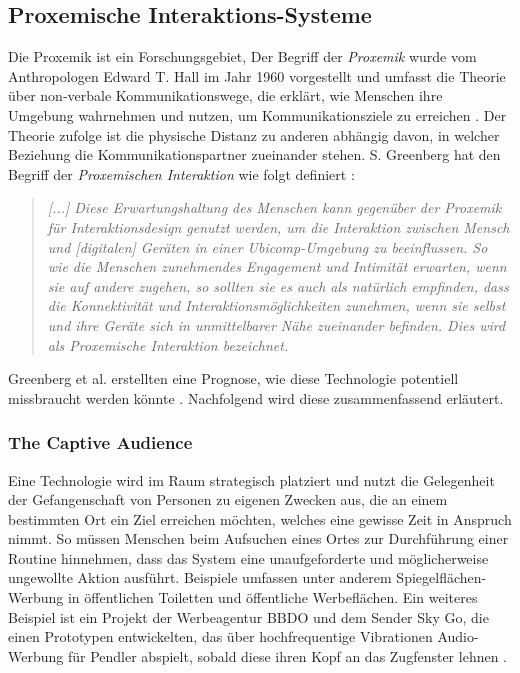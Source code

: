 \documentclass[a4paper]{article}
\newcommand{\todo}[1]{{\color{purple}{#1}}}
\begin{document}
\subsection{Proxemische Interaktions-Systeme}
\label{sub:proxemische_interaktions-systeme}{}
Die Proxemik ist ein Forschungsgebiet, 
Der Begriff der \textit{Proxemik} wurde vom Anthropologen Edward T. Hall im Jahr 1960 vorgestellt und umfasst die Theorie über non-verbale Kommunikationswege, die erklärt, wie Menschen ihre Umgebung wahrnehmen und nutzen, um Kommunikationsziele zu erreichen \cite{communicationstudies}. Der Theorie zufolge ist die physische Distanz zu anderen abhängig davon, in welcher Beziehung die Kommunikationspartner zueinander stehen. S. Greenberg hat den Begriff der \textit{Proxemischen Interaktion} wie folgt definiert \cite{marquardt}:\newline 
\begin{quote}
\textit{[...] Diese Erwartungshaltung des Menschen kann gegenüber der Proxemik für Interaktionsdesign genutzt werden, um die Interaktion zwischen Mensch und [digitalen] Geräten in einer Ubicomp-Umgebung \todo{Schönere Bezeichnung finden oder Definition formulieren} zu beeinflussen. So wie die Menschen zunehmendes Engagement und Intimität erwarten, wenn sie auf andere zugehen, so sollten sie es auch als natürlich empfinden, dass die Konnektivität und Interaktionsmöglichkeiten zunehmen, wenn sie selbst und ihre Geräte sich in unmittelbarer Nähe zueinander befinden. Dies wird als Proxemische Interaktion bezeichnet.}
\end{quote}
Greenberg et al. erstellten eine Prognose, wie diese Technologie potentiell missbraucht werden könnte \cite{greenberg}. Nachfolgend wird diese zusammenfassend erläutert.

\subsubsection{The Captive Audience}
\label{sssec:the_captive_audience}
Eine Technologie wird im Raum strategisch platziert und nutzt die Gelegenheit der \glqq Gefangenschaft\grqq{} von Personen zu eigenen Zwecken aus, die an einem bestimmten Ort ein Ziel erreichen möchten, welches eine gewisse Zeit in Anspruch nimmt. So müssen Menschen beim Aufsuchen eines Ortes zur Durchführung einer Routine hinnehmen, dass das System eine unaufgeforderte und möglicherweise ungewollte Aktion ausführt.\newline
Beispiele umfassen unter anderem Spiegelflächen-Werbung in öffentlichen Toiletten \cite{youtube} und öffentliche Werbeflächen. Ein weiteres Beispiel ist ein Projekt der Werbeagentur BBDO und dem Sender Sky Go, die einen Prototypen entwickelten, das über hochfrequentige Vibrationen Audio-Werbung für Pendler abspielt, sobald diese ihren Kopf an das Zugfenster lehnen \cite{zugfenster_ad}.  
\end{document}
